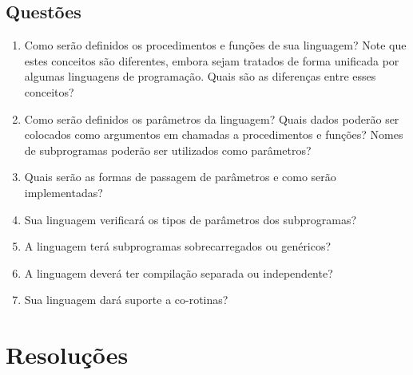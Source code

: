 \documentclass[12pt, a4paper]{article}
\begin{document}
        \subsection{Questões}
        \begin{enumerate}
            \item
            Como serão definidos os procedimentos e funções de sua linguagem?
            Note que estes conceitos são diferentes, embora sejam tratados de
            forma unificada por algumas linguagens de programação. Quais são as
            diferenças entre esses conceitos?

            \item
            Como serão definidos os parâmetros da linguagem? Quais dados
            poderão ser colocados como argumentos em chamadas a procedimentos e
            funções? Nomes de subprogramas poderão ser utilizados como
            parâmetros?

            \item
            Quais serão as formas de passagem de parâmetros e como serão
            implementadas?

            \item
            Sua linguagem verificará os tipos de parâmetros dos subprogramas?

            \item
            A linguagem terá subprogramas sobrecarregados ou genéricos?

            \item
            A linguagem deverá ter compilação separada ou independente?

            \item
            Sua linguagem dará suporte a co-rotinas?
        \end{enumerate}

    \section{Resoluções}
\end{document}
